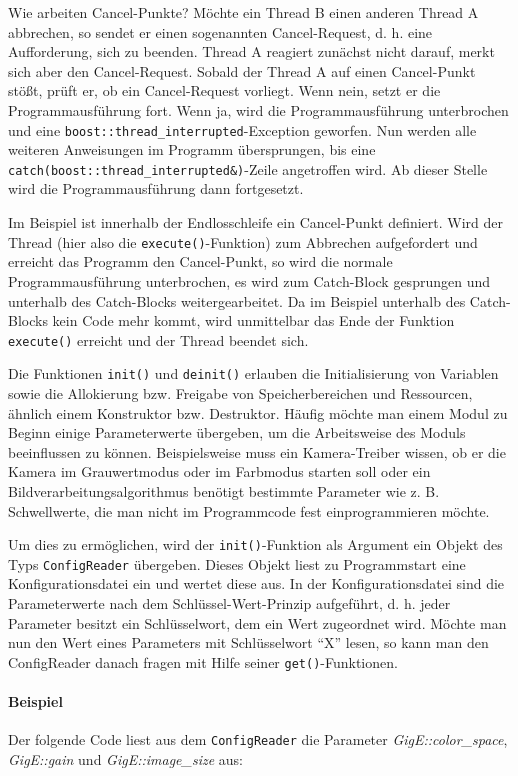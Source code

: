 \documentclass[a4paper, 11pt]{article}
\newcommand{\code}[1]{\texttt{#1}}
\begin{document}
{Wie arbeiten Cancel-Punkte? Möchte ein Thread B einen anderen Thread A abbrechen, so sendet er einen sogenannten Cancel-Request, d. h. eine Aufforderung, sich zu beenden. Thread A reagiert zunächst nicht darauf, merkt sich aber den Cancel-Request. Sobald der Thread A auf einen Cancel-Punkt stößt, prüft er, ob ein Cancel-Request vorliegt. Wenn nein, setzt er die Programmausführung fort. Wenn ja, wird die Programmausführung unterbrochen und eine \code{boost::thread\_interrupted}-Exception geworfen. Nun werden alle weiteren Anweisungen im Programm übersprungen, bis eine \code{catch(boost::thread\_interrupted\&)}-Zeile angetroffen wird. Ab dieser Stelle wird die Programmausführung dann fortgesetzt.

Im Beispiel ist innerhalb der Endlosschleife ein Cancel-Punkt definiert. Wird der Thread (hier also die \code{execute()}-Funktion) zum Abbrechen aufgefordert und erreicht das Programm den Cancel-Punkt, so wird die normale Programmausführung unterbrochen, es wird zum Catch-Block gesprungen und unterhalb des Catch-Blocks weitergearbeitet. Da im Beispiel unterhalb des Catch-Blocks kein Code mehr kommt, wird unmittelbar das Ende der Funktion \code{execute()} erreicht und der Thread beendet sich.

Die Funktionen \code{init()} und \code{deinit()} erlauben die Initialisierung von Variablen sowie die Allokierung bzw. Freigabe von Speicherbereichen und Ressourcen, ähnlich einem Konstruktor bzw. Destruktor. Häufig möchte man einem Modul zu Beginn einige Parameterwerte übergeben, um die Arbeitsweise des Moduls beeinflussen zu können. Beispielsweise muss ein Kamera-Treiber wissen, ob er die Kamera im Grauwertmodus oder im Farbmodus starten soll oder ein Bildverarbeitungsalgorithmus benötigt bestimmte Parameter wie z. B. Schwellwerte, die man nicht im Programmcode fest einprogrammieren möchte.

Um dies zu ermöglichen, wird der \code{init()}-Funktion als Argument ein Objekt des Typs \code{ConfigReader} übergeben. Dieses Objekt liest zu Programmstart eine Konfigurationsdatei ein und wertet diese aus. In der Konfigurationsdatei sind die Parameterwerte nach dem Schlüssel-Wert-Prinzip aufgeführt, d. h. jeder Parameter besitzt ein Schlüsselwort, dem ein Wert zugeordnet wird. Möchte man nun den Wert eines Parameters mit Schlüsselwort "`X"' lesen, so kann man den ConfigReader danach fragen mit Hilfe seiner \code{get()}-Funktionen.

\paragraph{Beispiel}
Der folgende Code liest aus dem \code{ConfigReader} die Parameter \textit{GigE::color\_space}, \textit{GigE::gain} und \textit{GigE::image\_size} aus:

}
\end{document}
